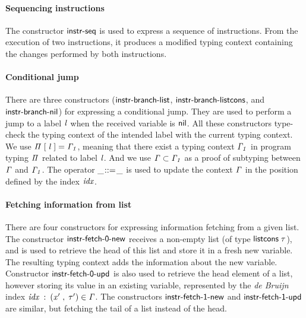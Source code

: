 \documentclass[sigconf]{acmart}
\theoremstyle{definition}
\newcommand{\D}[1]{\blue{\mathsf{#1}}}
\newcommand{\Con}[1]{\red{\mathsf{#1}}}
\newcommand{\F}[1]{\green{\mathsf{#1}}}
\newcommand{\V}[1]{\purple{\mathit{#1}}}
\begin{document}
\paragraph{Sequencing instructions}{The constructor \ensuremath{\Con{instr\textrm{-}seq}} is used to
express a sequence of instructions. From the execution of two instructions, it
produces a modified typing context containing the changes performed by
both instructions.}

\paragraph{Conditional jump}{There are three constructors (\ensuremath{\Con{instr\textrm{-}branch\textrm{-}list}},
\ensuremath{\Con{instr\textrm{-}branch\textrm{-}listcons}}, and \ensuremath{\Con{instr\textrm{-}branch\textrm{-}nil}}) for expressing a conditional
jump. They are used to perform a jump to a label \ensuremath{\V{l}} when the received variable is \ensuremath{\Con{nil}}.
All these constructors type-check the typing context of the intended label with the
current typing context. We use \ensuremath{\V{\Pi}\;\D{[}\;\V{l}\;\D{]=}\;\V{\Gamma_1}}, meaning that there exist a typing context
\ensuremath{\V{\Gamma_1}} in program typing \ensuremath{\V{\Pi}} related to label \ensuremath{\V{l}}. And we use \ensuremath{\V{\Gamma}\;\D{\subset}\;\V{\Gamma_1}} as a proof of
subtyping between \ensuremath{\V{\Gamma}} and \ensuremath{\V{\Gamma_1}}. The operator \ensuremath{\F{\_\hspace{-2pt}::=\hspace{-2pt}\_}} is used to update the context \ensuremath{\V{\Gamma}}
in the position defined by the index \ensuremath{\V{idx}}.}

\paragraph{Fetching information from list}{There are four constructors for expressing
information fetching from a given list. The constructor \ensuremath{\Con{instr\textrm{-}fetch\textrm{-}0\textrm{-}new}} receives a
non-empty list (of type \ensuremath{\Con{listcons}\;\V{\tau}}), and is used to retrieve the head of this list and store it
in a fresh new variable. The resulting typing context adds the information about the new
variable. Constructor \ensuremath{\Con{instr\textrm{-}fetch\textrm{-}0\textrm{-}upd}} is also used to retrieve the head element of a
list, however storing its value in an existing variable, represented by the \emph{de Bruijn}
index \ensuremath{\V{idx}\;\mathbin{:}\;(\V{x'}\;\red{,}\,\;\V{\tau'})\;\D{\in}\;\V{\Gamma}}. The constructors \ensuremath{\Con{instr\textrm{-}fetch\textrm{-}1\textrm{-}new}} and \ensuremath{\Con{instr\textrm{-}fetch\textrm{-}1\textrm{-}upd}}
are similar, but fetching the tail of a list instead of the head.}
\end{document}
